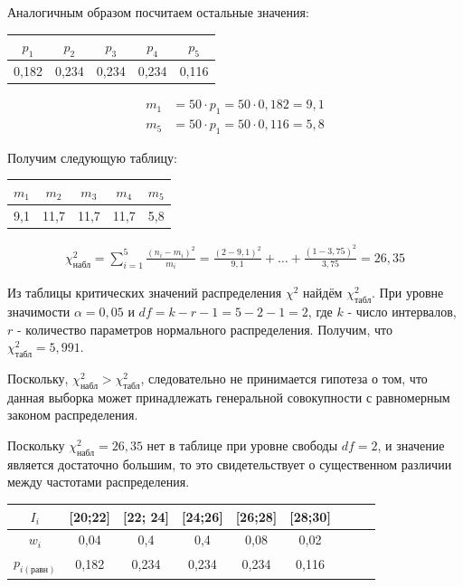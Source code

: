 \documentclass[utf8, a4paper, 14pt, russian, oneside]{book}
\begin{document}
Аналогичным образом посчитаем остальные значения:
\begin{table}[h!]
    \centering
    \begin{tabular}{|c|c|c|c|c|}
        \hline
        $p_1$ & $p_2$ &$p_3$ &$p_4$ &$p_5$ \\
        \hline
        0,182 & 0,234 & 0,234 & 0,234 & 0,116 \\
        \hline
    \end{tabular}
\end{table}
\begin{align*}
    m_1 &= 50 \cdot p_1 = 50 \cdot 0,182 = 9,1 \\
    m_5 &= 50 \cdot p_1 = 50 \cdot 0,116 = 5,8
\end{align*}

Получим следующую таблицу:
\begin{table}[h!]
    \centering
    \begin{tabular}{|c|c|c|c|c|}
        \hline
        $m_1$ & $m_2$ &$m_3$ &$m_4$ &$m_5$ \\
        \hline
        9,1 & 11,7 & 11,7 & 11,7 & 5,8 \\
        \hline
    \end{tabular}
\end{table}
\begin{align*}
    \chi^2_{\text{набл}} = \sum\limits_{i=1}^{5} \frac{(n_i - m_i)^2}{m_i} = \frac{(2 - 9,1)^2}{9,1} + \dots + \frac{(1 - 3,75)^2}{3,75} = 26,35
\end{align*}

Из таблицы критических значений распределения $\chi^2$ найдём $\chi^2_{\text{табл}}$. При уровне значимости $\alpha = 0,05$ и $df = k - r - 1 = 5 - 2 - 1 = 2$,
где $k$ - число интервалов, $r$ - количество параметров нормального распределения. Получим, что $\chi^2_{\text{табл}} = 5,991$.

Поскольку, $\chi^2_{\text{набл}} > \chi^2_{\text{табл}}$, следовательно не принимается гипотеза о том, что данная выборка может принадлежать генеральной совокупности
с равномерным законом распределения.


Поскольку $\chi^2_{\text{набл}} = 26,35$ нет в таблице при уровне свободы $df=2$, и значение является достаточно большим, то это свидетельствует о существенном различии между частотами распределения.


\begin{table}[h!]
    \centering
    \begin{tabular}{|c|c|c|c|c|c|c|c|c|}
        \hline
        $I_i$  & [20;22] & [22; 24] & [24;26] & [26;28] & [28;30] \\
        \hline
        $w_i$ & 0,04 & 0,4 & 0,4 & 0,08 & 0,02 \\
        \hline
        $p_{i(\text{равн})}$ & 0,182 & 0,234 & 0,234 & 0,234 & 0,116 \\
        \hline
    \end{tabular}
\end{table}
\end{document}
